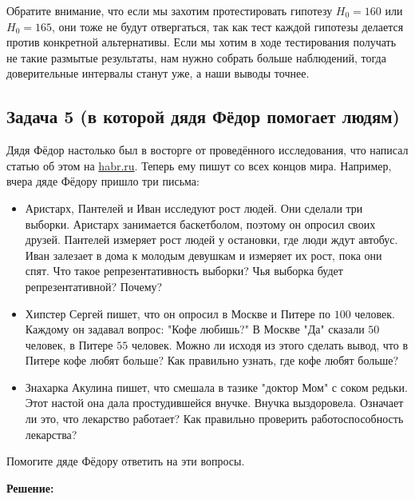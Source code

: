 \documentclass[12pt, a4paper, oneside]{article}
\begin{document}
Обратите внимание, что если мы захотим протестировать гипотезу $H_0 = 160$ или $H_0 = 165$, они тоже не будут отвергаться, так как тест каждой гипотезы делается против конкретной альтернативы. Если мы хотим в ходе тестирования получать не такие размытые результаты, нам нужно собрать больше наблюдений, тогда доверительные интервалы станут уже, а наши выводы точнее. 


\subsection*{Задача 5 (в которой  дядя Фёдор помогает людям)}

Дядя Фёдор настолько был в восторге от проведённого исследования, что написал статью об этом на \url{habr.ru}. Теперь ему пишут со всех концов мира. Например, вчера дяде Фёдору пришло три письма: 

\begin{itemize}
	\item Аристарх, Пантелей и Иван исследуют рост людей. Они сделали три выборки. Аристарх занимается баскетболом, поэтому он опросил своих друзей. Пантелей измеряет рост людей у остановки, где люди ждут автобус. Иван залезает в дома к молодым девушкам и измеряет их рост, пока они спят. Что такое репрезентативность выборки? Чья выборка будет репрезентативной? Почему? 
	
	\item Хипстер Сергей пишет, что он опросил в Москве и Питере по $100$ человек. Каждому он задавал вопрос: "Кофе любишь?"  В Москве "Да" сказали $50$ человек, в Питере $55$ человек. Можно ли исходя из этого сделать вывод, что в Питере кофе любят больше? Как правильно узнать, где кофе любят больше? 
	
	\item Знахарка Акулина пишет, что смешала в тазике  "доктор Мом" с соком редьки. Этот настой она дала простудившейся внучке. Внучка выздоровела. Означает ли это, что лекарство работает? Как правильно проверить работоспособность лекарства? 
\end{itemize}

Помогите дяде Фёдору ответить на эти вопросы. 

\textbf{Решение:} 
\end{document}
